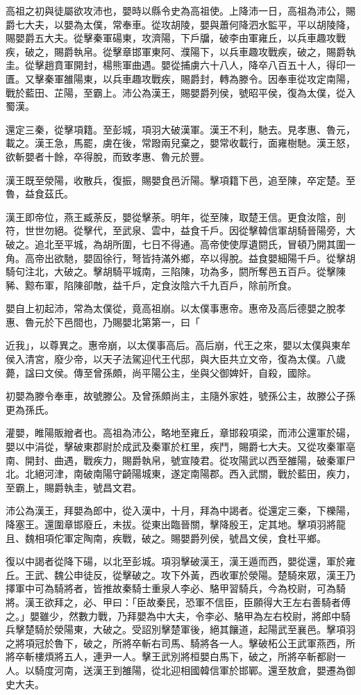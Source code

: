 \begin{pinyinscope}
高祖之初與徒屬欲攻沛也，嬰時以縣令史為高祖使。上降沛一日，高祖為沛公，賜爵七大夫，以嬰為太僕，常奉車。從攻胡陵，嬰與蕭何降泗水監平，平以胡陵降，賜嬰爵五大夫。從擊秦軍碭東，攻濟陽，下戶牖，破李由軍雍丘，以兵車趣攻戰疾，破之，賜爵執帛。從擊章邯軍東阿、濮陽下，以兵車趣攻戰疾，破之，賜爵執圭。從擊趙賁軍開封，楊熊軍曲遇。嬰從捕虜六十八人，降卒八百五十人，得印一匱。又擊秦軍雒陽東，以兵車趣攻戰疾，賜爵封，轉為滕令。因奉車從攻定南陽，戰於藍田、芷陽，至霸上。沛公為漢王，賜嬰爵列侯，號昭平侯，復為太僕，從入蜀漢。

還定三秦，從擊項籍。至彭城，項羽大破漢軍。漢王不利，馳去。見孝惠、魯元，載之。漢王急，馬罷，虜在後，常蹳兩兒棄之，嬰常收載行，面雍樹馳。漢王怒，欲斬嬰者十餘，卒得脫，而致孝惠、魯元於豐。

漢王既至滎陽，收散兵，復振，賜嬰食邑沂陽。擊項籍下邑，追至陳，卒定楚。至魯，益食茲氏。

漢王即帝位，燕王臧荼反，嬰從擊荼。明年，從至陳，取楚王信。更食汝陰，剖符，世世勿絕。從擊代，至武泉、雲中，益食千戶。因從擊韓信軍胡騎晉陽旁，大破之。追北至平城，為胡所圍，七日不得通。高帝使使厚遺閼氏，冒頓乃開其圍一角。高帝出欲馳，嬰固徐行，弩皆持滿外鄉，卒以得脫。益食嬰細陽千戶。從擊胡騎句注北，大破之。擊胡騎平城南，三陷陳，功為多，閼所奪邑五百戶。從擊陳豨、黥布軍，陷陳卻敵，益千戶，定食汝陰六千九百戶，除前所食。

嬰自上初起沛，常為太僕從，竟高祖崩。以太僕事惠帝。惠帝及高后德嬰之脫孝惠、魯元於下邑間也，乃賜嬰北第第一，曰「

近我」，以尊異之。惠帝崩，以太僕事高后。高后崩，代王之來，嬰以太僕與東牟侯入清宮，廢少帝，以天子法駕迎代王代邸，與大臣共立文帝，復為太僕。八歲薨，諡曰文侯。傳至曾孫頗，尚平陽公主，坐與父御婢奸，自殺，國除。

初嬰為滕令奉車，故號滕公。及曾孫頗尚主，主隨外家姓，號孫公主，故滕公子孫更為孫氏。

灌嬰，睢陽販繒者也。高祖為沛公，略地至雍丘，章邯殺項梁，而沛公還軍於碭，嬰以中涓從，擊破東郡尉於成武及秦軍於杠里，疾鬥，賜爵七大夫。又從攻秦軍亳南、開封、曲遇，戰疾力，賜爵執帛，號宣陵君。從攻陽武以西至雒陽，破秦軍尸北。北絕河津，南破南陽守齮陽城東，遂定南陽郡。西入武關，戰於藍田，疾力，至霸上，賜爵執圭，號昌文君。

沛公為漢王，拜嬰為郎中，從入漢中，十月，拜為中謁者。從還定三秦，下櫟陽，降塞王。還圍章邯廢丘，未拔。從東出臨晉關，擊降殷王，定其地。擊項羽將龍且、魏相項佗軍定陶南，疾戰，破之。賜嬰爵列侯，號昌文侯，食杜平鄉。

復以中謁者從降下碭，以北至彭城。項羽擊破漢王，漢王遁而西，嬰從還，軍於雍丘。王武、魏公申徒反，從擊破之。攻下外黃，西收軍於滎陽。楚騎來眾，漢王乃擇軍中可為騎將者，皆推故秦騎士重泉人李必、駱甲習騎兵，今為校尉，可為騎將。漢王欲拜之，必、甲曰：「臣故秦民，恐軍不信臣，臣願得大王左右善騎者傅之。」嬰雖少，然數力戰，乃拜嬰為中大夫，令李必、駱甲為左右校尉，將郎中騎兵擊楚騎於滎陽東，大破之。受詔別擊楚軍後，絕其饟道，起陽武至襄邑。擊項羽之將項冠於魯下，破之，所將卒斬右司馬、騎將各一人。擊破柘公王武軍燕西，所將卒斬樓煩將五人，連尹一人。擊王武別將桓嬰白馬下，破之，所將卒斬都尉一人。以騎度河南，送漢王到雒陽，從北迎相國韓信軍於邯鄲。還至敖倉，嬰遷為御史大夫。


\end{pinyinscope}
